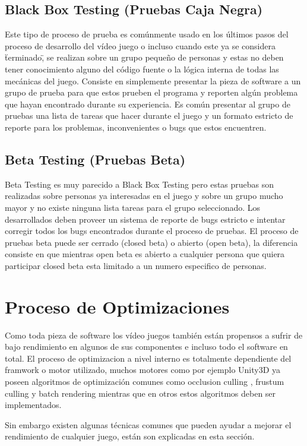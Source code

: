 \subsection{Black Box Testing (Pruebas Caja Negra)}
Este tipo de proceso de prueba es comúnmente usado en los últimos pasos del proceso de desarrollo del vídeo juego o incluso cuando este ya se considera  \"terminado\", se realizan sobre un grupo pequeño de personas y estas no deben tener conocimiento alguno del código fuente o la lógica interna de todas las mecánicas del juego. Consiste en simplemente presentar la pieza de software a un grupo de prueba para que estos prueben el programa y reporten algún problema que hayan encontrado durante su experiencia. Es común presentar al grupo de pruebas una lista de tareas que hacer durante el juego y un formato estricto de reporte para los problemas, inconvenientes o bugs que estos encuentren.
\subsection{Beta Testing (Pruebas Beta)}
Beta Testing es muy parecido a Black Box Testing pero estas pruebas son realizadas sobre personas ya interesadas en el juego y sobre un grupo mucho mayor y no existe ninguna lista tareas para el grupo seleccionado. Los desarrollados deben proveer un sistema de reporte de bugs estricto e intentar corregir todos los bugs encontrados durante el proceso de pruebas. El proceso de pruebas beta puede ser cerrado (closed beta) o abierto (open beta), la diferencia consiste en que mientras open beta es abierto a cualquier persona que quiera participar closed beta esta limitado a un numero especifico de personas. 

\section{Proceso de Optimizaciones}
Como toda pieza de software los vídeo juegos también están propensos a sufrir de bajo rendimiento en algunos de sus componentes e incluso todo el software en total. El proceso de optimizacion a nivel interno es totalmente dependiente del framwork o motor utilizado, muchos motores como por ejemplo Unity3D ya poseen algoritmos de optimización comunes como occlusion culling \cite{unity_culling}, frustum culling \cite{unity_camera} y batch rendering \cite{unity_batch} mientras que en otros estos algoritmos deben ser implementados.

Sin embargo existen algunas técnicas comunes que pueden ayudar a mejorar el rendimiento de cualquier juego, están son explicadas en esta sección.


